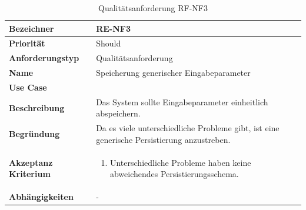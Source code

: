\begin{table}[ht]
\centering
  \begin{tabular}{ l | p{8cm} }
	\hline
	\rowcolor{gray}
	\textbf{Bezeichner}&	\textbf{RE-NF3}\\ \hline
	\textbf{Priorität} 		&	Should\\ \hline
	\textbf{Anforderungstyp}	&	Qualitätsanforderung\\ \hline
	\textbf{Name} 			&	Speicherung generischer Eingabeparameter\\ \hline
	\textbf{Use Case} 		&	\nameref{table:use_case_1}\\ \hline
	\textbf{Beschreibung} 	&	Das System sollte Eingabeparameter einheitlich abspeichern.\\ \hline
	\textbf{Begründung} 		&	Da es viele unterschiedliche Probleme gibt, ist eine generische Persistierung anzustreben.\\ \hline
	\textbf{Akzeptanz Kriterium}	&	\begin{enumerate}
					\item Unterschiedliche Probleme haben keine abweichendes Persistierungsschema.
					\end{enumerate}
					\\ \hline
	\textbf{Abhängigkeiten} 	&	-\\ \hline
  \end{tabular}
   \caption{Qualitätsanforderung RF-NF3}\label{table:req_nf_3}
\end{table}

\newpage
